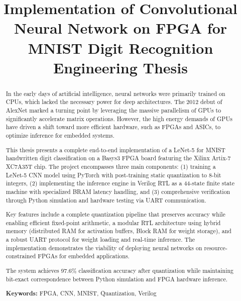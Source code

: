 \documentclass[12pt,a4paper]{report}
\title{
    \textbf{Implementation of Convolutional Neural Network on FPGA for MNIST Digit Recognition}\\[1cm]
    \large Engineering Thesis
}
\author{}
\date{}
\begin{document}
\thispagestyle{empty}
\mbox{}
\newpage

\thispagestyle{empty}
\begin{abstract}
In the early days of artificial intelligence, neural networks were primarily trained on CPUs, which lacked the necessary power for deep architectures. The 2012 debut of AlexNet marked a turning point by leveraging the massive parallelism of GPUs to significantly accelerate matrix operations. However, the high energy demands of GPUs have driven a shift toward more efficient hardware, such as FPGAs and ASICs, to optimize inference for embedded systems.

This thesis presents a complete end-to-end implementation of a LeNet-5 for MNIST handwritten digit classification on a Basys3 FPGA board featuring the Xilinx Artix-7 XC7A35T chip. The project encompasses three main components: (1) training a LeNet-5 CNN model using PyTorch with post-training static quantization to 8-bit integers, (2) implementing the inference engine in Verilog RTL as a 44-state finite state machine with specialized BRAM latency handling, and (3) comprehensive verification through Python simulation and hardware testing via UART communication.

Key features include a complete quantization pipeline that preserves accuracy while enabling efficient fixed-point arithmetic, a modular RTL architecture using hybrid memory (distributed RAM for activation buffers, Block RAM for weight storage), and a robust UART protocol for weight loading and real-time inference. The implementation demonstrates the viability of deploying neural networks on resource-constrained FPGAs for embedded applications.

The system achieves 97.6\% classification accuracy after quantization while maintaining bit-exact correspondence between Python simulation and FPGA hardware inference.

\textbf{Keywords:} FPGA, CNN, MNIST, Quantization, Verilog
\end{abstract}

\thispagestyle{empty}
\mbox{}
\newpage
\end{document}
